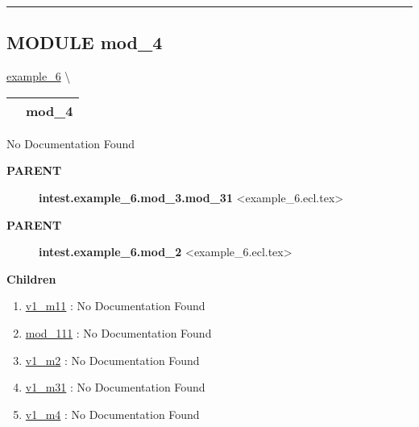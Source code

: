 \rule{\linewidth}{0.5pt}




\subsection*{\textsf{\colorbox{headtoc}{\color{white} MODULE}
mod\_4}}

\hypertarget{ecldoc:intest.example_6.mod_4}{}
\hspace{0pt} \hyperlink{ecldoc:intest.example_6}{example_6} \textbackslash 

{\renewcommand{\arraystretch}{1.5}
\begin{tabularx}{\textwidth}{|>{\raggedright\arraybackslash}l|X|}
\hline
\hspace{0pt}\mytexttt{\color{red} } & \textbf{mod\_4} \\
\hline
\end{tabularx}
}

\par





No Documentation Found










\par
\begin{description}
\item [\colorbox{tagtype}{\color{white} \textbf{\textsf{PARENT}}}] \textbf{intest.example\_6.mod\_3.mod\_31} <example\_6.ecl.tex>
\item [\colorbox{tagtype}{\color{white} \textbf{\textsf{PARENT}}}] \textbf{intest.example\_6.mod\_2} <example\_6.ecl.tex>
\end{description}


\textbf{Children}
\begin{enumerate}
\item \hyperlink{ecldoc:intest.example_6.mod_1.mod_11.v1_m11}{v1\_m11}
: No Documentation Found
\item \hyperlink{ecldoc:intest.example_6.mod_1.mod_11.mod_111}{mod\_111}
: No Documentation Found
\item \hyperlink{ecldoc:intest.example_6.mod_2.v1_m2}{v1\_m2}
: No Documentation Found
\item \hyperlink{ecldoc:intest.example_6.mod_3.mod_31.v1_m31}{v1\_m31}
: No Documentation Found
\item \hyperlink{ecldoc:intest.example_6.mod_4.v1_m4}{v1\_m4}
: No Documentation Found
\end{enumerate}

